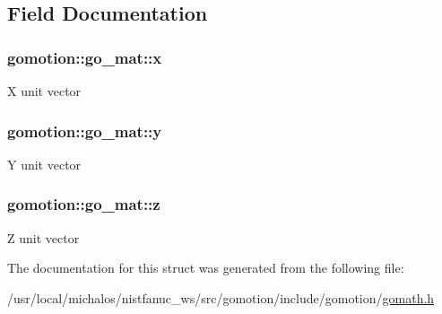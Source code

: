 \subsection{Field Documentation}
\hypertarget{structgomotion_1_1go__mat_a53b13939d829ceb25ad338899cc41ebb}{
\subsubsection[{x}]{ gomotion\-::go\-\_\-mat\-::x}}\label{structgomotion_1_1go__mat_a53b13939d829ceb25ad338899cc41ebb}
X unit vector \hypertarget{structgomotion_1_1go__mat_a77d00fb0a019de108943dc3510db99d7}{
\subsubsection[{y}]{ gomotion\-::go\-\_\-mat\-::y}}\label{structgomotion_1_1go__mat_a77d00fb0a019de108943dc3510db99d7}
Y unit vector \hypertarget{structgomotion_1_1go__mat_ab6b8b051c8695a4a07da09a4b76da95e}{
\subsubsection[{z}]{ gomotion\-::go\-\_\-mat\-::z}}\label{structgomotion_1_1go__mat_ab6b8b051c8695a4a07da09a4b76da95e}
Z unit vector 

The documentation for this struct was generated from the following file\-:\begin{DoxyCompactItemize}
\item 
/usr/local/michalos/nistfanuc\-\_\-ws/src/gomotion/include/gomotion/\hyperlink{gomath_8h}{gomath.\-h}\end{DoxyCompactItemize}
